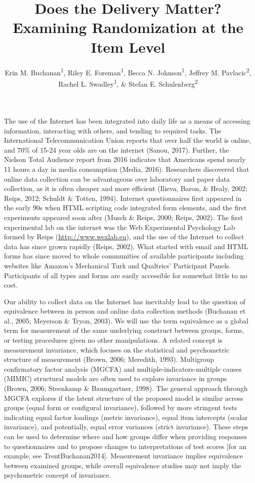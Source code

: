\documentclass[english,man, mask]{apa6}
\title{Does the Delivery Matter? Examining Randomization at the Item Level}
\author{Erin M. Buchanan\textsuperscript{1}, Riley E. Foreman\textsuperscript{1}, Becca N. Johnson\textsuperscript{1}, Jeffrey M. Pavlacic\textsuperscript{2}, Rachel L. Swadley\textsuperscript{1}, \& Stefan E. Schulenberg\textsuperscript{2}}
\affiliation{
    \vspace{0.5cm}
          \textsuperscript{1} Missouri State University\\
          \textsuperscript{2} University of Mississippi  }
\theoremstyle{definition}
\theoremstyle{definition}
\theoremstyle{definition}
\theoremstyle{remark}
\begin{document}
\maketitle

\setcounter{secnumdepth}{0}



The use of the Internet has been integrated into daily life as a means
of accessing information, interacting with others, and tending to
required tasks. The International Telecommunication Union reports that
over half the world is online, and 70\% of 15-24 year olds are on the
internet (Sanou, 2017). Further, the Nielson Total Audience report from
2016 indicates that Americans spend nearly 11 hours a day in media
consumption (Media, 2016). Researchers discovered that online data
collection can be advantageous over laboratory and paper data
collection, as it is often cheaper and more efficient (Ilieva, Baron, \&
Healy, 2002; Reips, 2012; Schuldt \& Totten, 1994). Internet
questionnaires first appeared in the early 90s when HTML scripting code
integrated form elements, and the first experiments appeared soon after
(Musch \& Reips, 2000; Reips, 2002). The first experimental lab on the
internet was the Web Experimental Psychology Lab formed by Reips
(\url{http://www.wexlab.eu}), and the use of the Internet to collect
data has since grown rapidly (Reips, 2002). What started with email and
HTML forms has since moved to whole communities of available
participants including websites like Amazon's Mechanical Turk and
Qualtrics' Participant Panels. Participants of all types and forms are
easily accessible for somewhat little to no cost.

Our ability to collect data on the Internet has inevitably lead to the
question of equivalence between in person and online data collection
methods (Buchanan et al., 2005; Meyerson \& Tryon, 2003). We will use
the term equivalence as a global term for measurement of the same
underlying construct between groups, forms, or testing procedures given
no other manipulations. A related concept is measurement invariance,
which focuses on the statistical and psychometric structure of
measurement (Brown, 2006; Meredith, 1993). Multigroup confirmatory
factor analysis (MGCFA) and multiple-indicators-multiple causes (MIMIC)
structural models are often used to explore invariance in groups (Brown,
2006; Steenkamp \& Baumgartner, 1998). The general approach through
MGCFA explores if the latent structure of the proposed model is similar
across groups (equal form or configural invariance), followed by more
stringent tests indicating equal factor loadings (metric invariance),
equal item intercepts (scalar invariance), and potentially, equal error
variances (strict invariance). These steps can be used to determine
where and how groups differ when providing responses to questionnaires
and to propose changes to interpretations of test scores {[}for an
example, see TrentBuchanan2014{]}. Measurement invariance implies
equivalence between examined groups, while overall equivalence studies
may not imply the psychometric concept of invariance.
\end{document}
